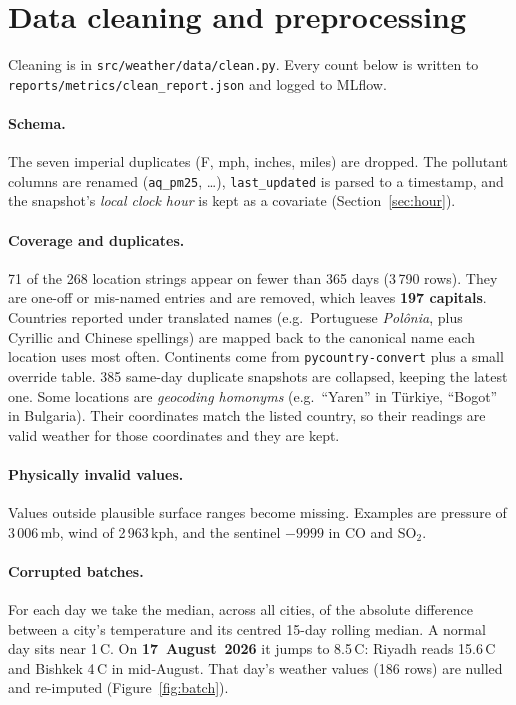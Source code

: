 \section{Data cleaning and preprocessing}\label{sec:cleaning}
Cleaning is in \nolinkurl{src/weather/data/clean.py}. Every count below is written to
\nolinkurl{reports/metrics/clean_report.json} and logged to MLflow.

\paragraph{Schema.} The seven imperial duplicates (\textdegree F, mph, inches, miles) are dropped.
The pollutant columns are renamed (\texttt{aq\_pm25}, \dots), \texttt{last\_updated} is parsed to a timestamp,
and the snapshot's \emph{local clock hour} is kept as a covariate (Section~\ref{sec:hour}).

\paragraph{Coverage and duplicates.} 71 of the 268 location strings appear on fewer than 365 days
(3\,790 rows). They are one-off or mis-named entries and are removed, which leaves \textbf{197 capitals}.
Countries reported under translated names (e.g.\ Portuguese \emph{Polônia}, plus Cyrillic and Chinese spellings) are mapped back to
the canonical name each location uses most often. Continents come from \texttt{pycountry-convert} plus a
small override table. 385 same-day duplicate snapshots are collapsed, keeping the latest one.
Some locations are \emph{geocoding homonyms} (e.g.\ ``Yaren'' in Türkiye, ``Bogot'' in Bulgaria). Their
coordinates match the listed country, so their readings are valid weather for those coordinates and they are kept.

\paragraph{Physically invalid values.} Values outside plausible surface ranges become missing.
Examples are pressure of 3\,006\,mb, wind of 2\,963\,kph, and the sentinel $-9999$ in CO and SO$_2$.

\paragraph{Corrupted batches.} For each day we take the median, across all cities, of the absolute
difference between a city's temperature and its centred 15-day rolling median. A normal day sits near 1\,\textdegree C. On
\textbf{17~August~2026} it jumps to 8.5\,\textdegree C: Riyadh reads 15.6\,\textdegree C and Bishkek
4\,\textdegree C in mid-August. That day's weather values (186 rows) are nulled and re-imputed
(Figure~\ref{fig:batch}).

